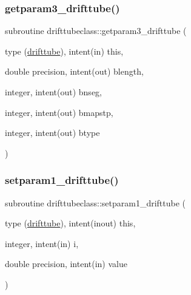 \mbox{\label{namespacedrifttubeclass_a4dc53dfc73175d3eb0d420c6cb9d64f8}} 
\subsubsection{\texorpdfstring{getparam3\_drifttube()}{getparam3\_drifttube()}}
{\footnotesize\ttfamily subroutine drifttubeclass\+::getparam3\+\_\+drifttube (\begin{DoxyParamCaption}\item[{type (\mbox{\hyperlink{namespacedrifttubeclass_structdrifttubeclass_1_1drifttube}{drifttube}}), intent(in)}]{this,  }\item[{double precision, intent(out)}]{blength,  }\item[{integer, intent(out)}]{bnseg,  }\item[{integer, intent(out)}]{bmapstp,  }\item[{integer, intent(out)}]{btype }\end{DoxyParamCaption})}

\mbox{\label{namespacedrifttubeclass_ae2e1974821a810c5d65afd4546b1a690}} 
\subsubsection{\texorpdfstring{setparam1\_drifttube()}{setparam1\_drifttube()}}
{\footnotesize\ttfamily subroutine drifttubeclass\+::setparam1\+\_\+drifttube (\begin{DoxyParamCaption}\item[{type (\mbox{\hyperlink{namespacedrifttubeclass_structdrifttubeclass_1_1drifttube}{drifttube}}), intent(inout)}]{this,  }\item[{integer, intent(in)}]{i,  }\item[{double precision, intent(in)}]{value }\end{DoxyParamCaption})}

\mbox{\label{namespacedrifttubeclass_a3883fd9688d0b98e279f57547de67b8c}} 
